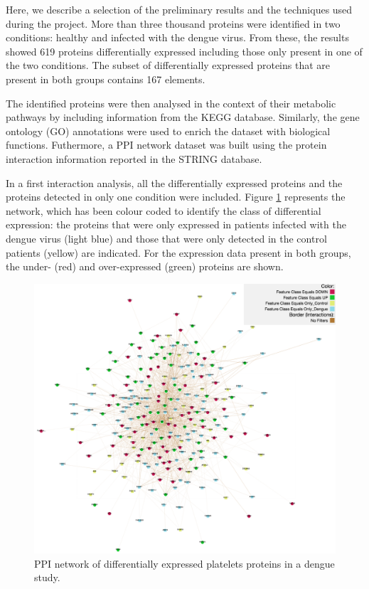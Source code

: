 Here, we describe a selection of the preliminary results and the techniques used during the project. More than three thousand proteins were identified in two conditions: healthy and infected with the dengue virus. From these, the results showed 619 proteins differentially expressed including those only present in one of the two conditions. The subset of differentially expressed proteins that are present in both groups contains 167 elements.

The identified proteins were then analysed in the context of their metabolic pathways by including information from the KEGG database. Similarly, the gene ontology (GO) annotations were used to enrich the dataset with biological functions.  Futhermore, a PPI network dataset was built using the protein interaction information reported in the STRING database.

In a first interaction analysis, all the differentially expressed proteins and the proteins detected in only one condition were included. Figure \ref{fig:pinv_platelets_1} represents the network, which has been colour coded to identify the class of differential expression: the proteins that were only expressed in patients infected with the dengue virus (light blue) and those that were only detected in the control patients (yellow) are indicated. For the expression data present in both groups, the under- (red) and over-expressed (green) proteins are shown.  

\begin{figure}
\centering
\includegraphics[width=\textwidth]{figures/pinv_platelets_1.png}
\caption[PPI network of differentially expressed platelets proteins in a dengue study.]{PPI network of differentially expressed platelets proteins in a dengue study.
\label{fig:pinv_platelets_1}}
\end{figure}

